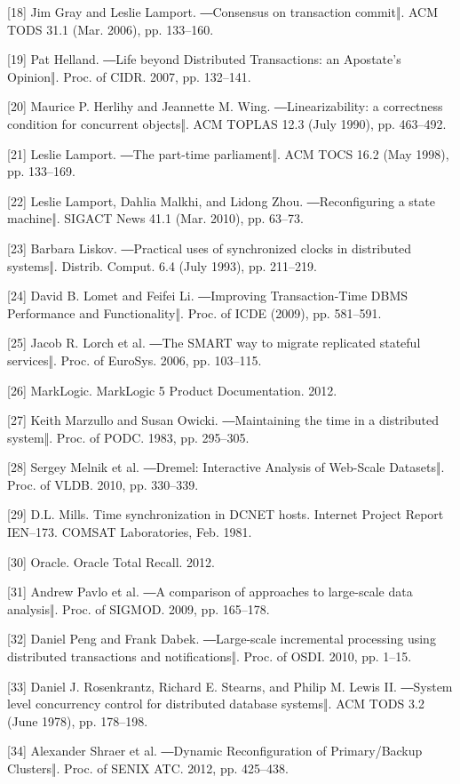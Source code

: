 \documentclass[letterpaper,twocolumn,10pt]{article}
\begin{document}
[18] Jim Gray and Leslie Lamport. ―Consensus on transaction commit‖. ACM TODS 31.1 (Mar. 2006), pp. 133–160.

[19] Pat Helland. ―Life beyond Distributed Transactions: an Apostate’s Opinion‖. Proc. of CIDR. 2007, pp. 132–141.

[20] Maurice P. Herlihy and Jeannette M. Wing. ―Linearizability: a correctness condition for
concurrent objects‖. ACM TOPLAS 12.3 (July 1990), pp. 463–492.

[21] Leslie Lamport. ―The part-time parliament‖. ACM TOCS 16.2 (May 1998), pp. 133–169.

[22] Leslie Lamport, Dahlia Malkhi, and Lidong Zhou. ―Reconfiguring a state machine‖. SIGACT News 41.1 (Mar. 2010), pp. 63–73.

[23] Barbara Liskov. ―Practical uses of synchronized clocks in distributed systems‖. Distrib. Comput. 6.4 (July 1993), pp. 211–219.

[24] David B. Lomet and Feifei Li. ―Improving Transaction-Time DBMS Performance and Functionality‖. Proc. of ICDE (2009), pp. 581–591.

[25] Jacob R. Lorch et al. ―The SMART way to migrate replicated stateful services‖. Proc. of EuroSys. 2006, pp. 103–115.

[26] MarkLogic. MarkLogic 5 Product Documentation. 2012.

[27] Keith Marzullo and Susan Owicki. ―Maintaining the time in a distributed system‖. Proc. of PODC. 1983, pp. 295–305.

[28] Sergey Melnik et al. ―Dremel: Interactive Analysis of Web-Scale Datasets‖. Proc. of VLDB. 2010, pp. 330–339.

[29] D.L. Mills. Time synchronization in DCNET hosts. Internet Project Report IEN–173. COMSAT Laboratories, Feb. 1981.

[30] Oracle. Oracle Total Recall. 2012.

[31] Andrew Pavlo et al. ―A comparison of approaches to large-scale data analysis‖. Proc. of SIGMOD. 2009, pp. 165–178.

[32] Daniel Peng and Frank Dabek. ―Large-scale incremental processing using distributed transactions and notifications‖. Proc. of OSDI. 2010, pp. 1–15.

[33] Daniel J. Rosenkrantz, Richard E. Stearns, and Philip M. Lewis II. ―System level concurrency control for distributed database systems‖. ACM TODS 3.2 (June 1978), pp. 178–198.

[34] Alexander Shraer et al. ―Dynamic Reconfiguration of Primary/Backup Clusters‖. Proc. of
SENIX ATC. 2012, pp. 425–438.
\end{document}
